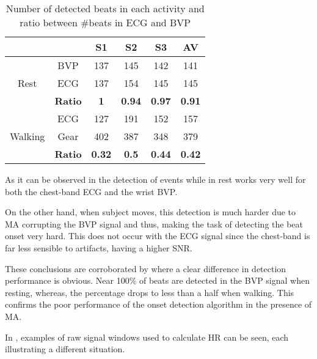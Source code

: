 \begin{table}[!h]
	\centering
	\caption{Number of detected beats in each activity and ratio between $ \# $beats in ECG and BVP}
	\label{table:beats}
	\begin{tabular}{cc|c|c|c|c|}
		\cline{3-6}
		&                & S1            & S2            & S3            & AV            \\ \hline
		\multicolumn{1}{|c|}{\multirow{3}{*}{Rest}}    & BVP            & 137           & 145           & 142           & 141           \\ \cline{2-6} 
		\multicolumn{1}{|c|}{}                         & ECG           & 137           & 154           & 145           & 145           \\ \cline{2-6} 
		\multicolumn{1}{|c|}{}                         & \textbf{Ratio} & \textbf{1}    & \textbf{0.94} & \textbf{0.97} & \textbf{0.91} \\ \hline
		\multicolumn{1}{|c|}{\multirow{3}{*}{Walking}} & ECG            & 127           & 191           & 152           & 157           \\ \cline{2-6} 
		\multicolumn{1}{|c|}{}                         & Gear           & 402           & 387           & 348           & 379           \\ \cline{2-6} 
		\multicolumn{1}{|c|}{}                         & \textbf{Ratio} & \textbf{0.32} & \textbf{0.5}  & \textbf{0.44} & \textbf{0.42} \\ \hline
	\end{tabular}
\end{table}


As it can be observed in  the detection of events while in rest works very well for both the chest-band ECG and the wrist BVP. 

On the other hand, when subject moves, this detection is much harder due to MA corrupting the BVP signal and thus, making the task of detecting the beat onset very hard. This does not occur with the ECG signal since the chest-band is far less sensible to artifacts, having a higher SNR.

These conclusions are corroborated by  where a clear difference in detection performance is obvious. Near 100\% of beats are detected in the BVP signal when resting, whereas, the percentage drops to less than a half when walking. This confirms the poor performance of the onset detection algorithm in the presence of MA.

In , examples of raw signal windows used to calculate HR can be seen, each illustrating a different situation. 

